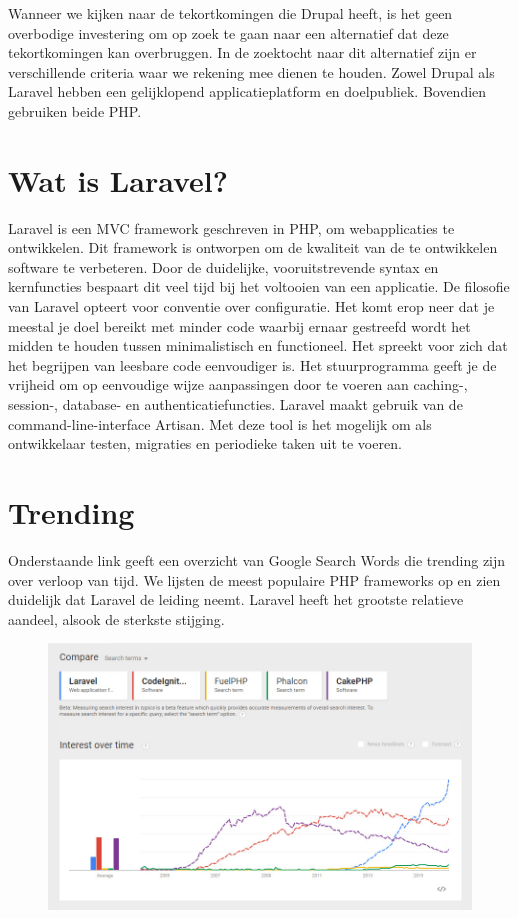 \label{ch:laravel}
Wanneer we kijken naar de tekortkomingen die Drupal heeft, is het geen overbodige investering om op zoek te gaan naar een alternatief dat deze tekortkomingen kan overbruggen. In de zoektocht naar dit alternatief zijn er verschillende criteria waar we rekening mee dienen te houden. Zowel Drupal als Laravel hebben een gelijklopend applicatieplatform en doelpubliek. Bovendien gebruiken beide PHP. 

\section{Wat is Laravel?}
Laravel is een MVC framework geschreven in PHP, om webapplicaties te ontwikkelen. Dit framework is ontworpen om de kwaliteit van de te ontwikkelen software te verbeteren. Door de duidelijke, vooruitstrevende syntax en kernfuncties bespaart dit veel tijd bij het voltooien van een applicatie. De filosofie van Laravel opteert voor conventie over configuratie. Het komt erop neer dat je meestal je doel bereikt met minder code waarbij ernaar gestreefd wordt het midden te houden tussen minimalistisch en functioneel. Het spreekt voor zich dat het begrijpen van leesbare code eenvoudiger is. Het stuurprogramma geeft je de vrijheid om op eenvoudige wijze aanpassingen door te voeren aan caching-, session-, database- en authenticatiefuncties. 
\newline\newline
Laravel maakt gebruik van de command-line-interface Artisan. Met deze tool is het mogelijk om als ontwikkelaar testen, migraties en periodieke taken uit te voeren. 

\section{Trending}
Onderstaande link geeft een overzicht van Google Search Words die trending zijn over verloop van tijd. We lijsten de meest populaire PHP frameworks op en zien duidelijk dat Laravel de leiding neemt. Laravel heeft het grootste relatieve aandeel, alsook de sterkste stijging. 
\newline\newline\noindent

\begin{figure}[!ht]
  \includegraphics[width=120mm]{img/googletrends1.jpg}
  \centering
  \label{fig:googletrends Laravel 1}
\end{figure}
 
